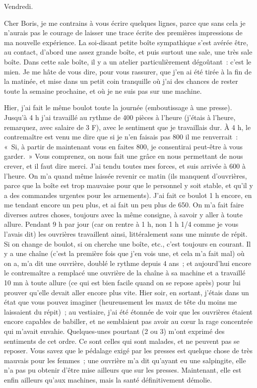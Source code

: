 \documentclass[french,twoside]{book} %
\begin{document}
\noindent \par
Vendredi.\par
Cher Boris, je me contrains à vous écrire quelques lignes, parce que sans cela je n'aurais pas le courage de laisser une trace écrite des premières impressions de ma nouvelle expérience. La soi-disant petite boîte sympathique s'est avérée être, au contact, d'abord une assez grande boîte, et puis surtout une sale, une très sale boîte. Dans cette sale boîte, il y a un atelier particulièrement dégoûtant : c'est le mien. Je me hâte de vous dire, pour vous rassurer, que j'en ai été tirée à la fin de la matinée, et mise dans un petit coin tranquille où j'ai des chances de rester toute la semaine prochaine, et où je ne suis pas sur une machine.\par
Hier, j'ai fait le même boulot toute la journée (emboutissage à une presse). Jusqu'à 4 h j'ai travaillé au rythme de 400 pièces à l'heure (j'étais à l'heure, remarquez, avec salaire de 3 F), avec le sentiment que je travaillais dur. À 4 h, le contremaître est venu me dire que si je n'en faisais pas 800 il me renverrait : « Si, à partir de maintenant vous en faites 800, je consentirai peut-être à vous garder. » Vous comprenez, on nous fait une grâce en nous permettant de nous crever, et il faut dire merci. J'ai tendu toutes mes forces, et suis arrivée à 600 à l'heure. On m'a quand même laissée revenir ce matin (ils manquent d'ouvrières, parce que la boîte est trop mauvaise pour que le personnel y soit stable, et qu'il y a des commandes urgentes pour les armements). J'ai fait ce boulot 1 h encore, en me tendant encore un peu plus, et ai fait un peu plus de 650. On m'a fait faire diverses autres choses, toujours avec la même consigne, à savoir y aller à toute allure. Pendant 9 h par jour (car on rentre à 1 h, non 1 h 1/4 comme je vous l'avais dit) les ouvrières travaillent ainsi, littéralement sans une minute de répit. Si on change de boulot, si on cherche une boîte, etc., c'est toujours en courant. Il y a une chaîne (c'est la première fois que j'en vois une, et cela m'a fait mal) où on a, m'a dit une ouvrière, doublé le rythme depuis 4 ans ; et aujourd'hui encore le contremaître a remplacé une ouvrière de la chaîne à sa machine et a travaillé 10 mn à toute allure (ce qui est bien facile quand on se repose après) pour lui prouver qu'elle devait aller encore plus vite. Hier soir, en sortant, j'étais dans un état que vous pouvez imaginer (heureusement les maux de tête du moins me laissaient du répit) ; au vestiaire, j'ai été étonnée de voir que les ouvrières étaient encore capables de babiller, et ne semblaient pas avoir au cœur la rage concentrée qui m'avait envahie. Quelques-unes pourtant (2 ou 3) m'ont exprimé des sentiments de cet ordre. Ce sont celles qui sont malades, et ne peuvent pas se reposer. Vous savez que le pédalage exigé par les presses est quelque chose de très mauvais pour les femmes ; une ouvrière m'a dit qu'ayant eu une salpingite, elle n'a pas pu obtenir d'être mise ailleurs que sur les presses. Maintenant, elle est enfin ailleurs qu'aux machines, mais la santé définitivement démolie.\par
\end{document}
